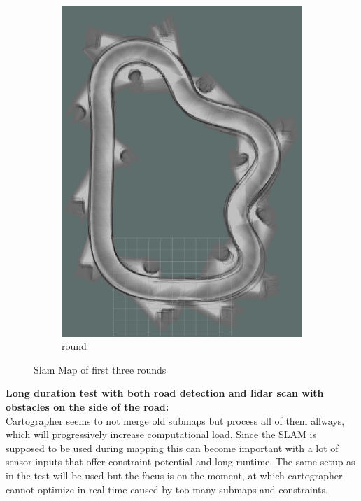 \begin{figure}[H]
\begin{subfigure}{.3\linewidth}
		\includegraphics[width=\textwidth]{Pictures/2slamtest3}
		\caption{ round}
	\end{subfigure}

	\caption{Slam Map of first three rounds}
	\label{2slamtest}

\end{figure}



\textbf{Long duration test with both road detection and lidar scan with obstacles on the side of the road:}\\
Cartographer seems to not merge old submaps but process all of them allways, which will progressively increase computational load. Since the SLAM is supposed to be used during mapping this can become important with a lot of sensor inputs that offer constraint potential and long runtime.
The same setup as in the  test will be used but the focus is on the moment, at which cartographer cannot optimize in real time caused by too many submaps and constraints.\\


